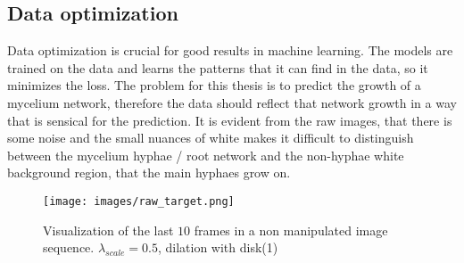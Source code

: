\documentclass[a4paper,12pt]{article}
\begin{document}
\subsection{Data optimization}
Data optimization is crucial for good results in machine learning. The models are trained on the data and learns the patterns that it can find in the data, so it minimizes the loss. The problem for this thesis is to predict the growth of a mycelium network, therefore the data should reflect that network growth in a way that is sensical for the prediction. It is evident from the raw images, that there is some noise and the small nuances of white makes it difficult to distinguish between the mycelium hyphae / root network and the non-hyphae white background region, that the main hyphaes grow on.
\begin{figure}[H]
  \centering
  \texttt{[image: images/raw\_target.png]}
  \caption{Visualization of the last $10$ frames in a non manipulated image sequence. $\lambda_{scale}=0.5$, dilation with disk(1)} %
  \label{fig:n11}
\end{figure}
\end{document}
